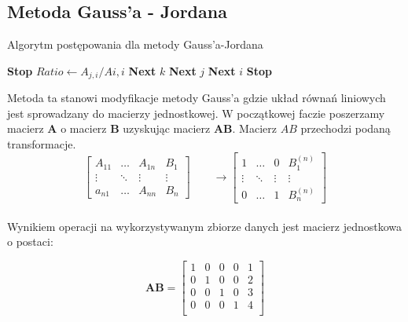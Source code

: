 \documentclass{article}
\begin{document}
\subsection{Metoda Gauss'a - Jordana}
\begin{algorithm}[H]
    \caption{Algorytm postępowania dla metody Gauss'a-Jordana}\label{euclid}
    \begin{algorithmic}[1]
                \State \textbf{Stop}
            \EndIf
                    \State $Ratio \gets A_{j,i} / A{i,i}$
                    \State \textbf{Next} $k$
                    \EndFor
                \EndIf
            \State \textbf{Next} $j$
            \EndFor
        \State \textbf{Next} $i$
        \EndFor
        \State \textbf{Stop}
        \EndProcedure
    \end{algorithmic}
\end{algorithm}
Metoda ta stanowi modyfikacje metody Gauss'a gdzie układ  równań liniowych jest sprowadzany do macierzy jednostkowej. W początkowej faczie poszerzamy macierz $\mathbf{A}$ o macierz $\mathbf{B}$ uzyskując macierz $\mathbf{AB}$. Macierz $AB$ przechodzi podaną transformacje. \\
\[
\begin{bmatrix} 
    A_{11} & \dots & A_{1n} & B_{1} \\
    \vdots & \ddots & \vdots & \vdots \\
    a_{n1} &  \dots & A_{nn}     & B_{n} 
    \end{bmatrix}
\qquad
\rightarrow \begin{bmatrix} 
    1 & \dots & 0 & B_{1}^{(n)} \\
    \vdots & \ddots & \vdots & \vdots \\
    0 &  \dots & 1    & B_{n}^{(n)} 
    \end{bmatrix}
\]\\
Wynikiem operacji na wykorzystywanym zbiorze danych jest macierz jednostkowa o postaci:
\begin{center}
    \begin{equation*}
        \mathbf{AB}=\begin{bmatrix}1 & 0 & 0 & 0 & 1\\0 & 1 & 0 & 0 & 2\\ 0 & 0 & 1 & 0 & 3\\ 0 & 0 & 0 & 1 & 4\\\end{bmatrix}
    \end{equation*}
\end{center}
\end{document}
